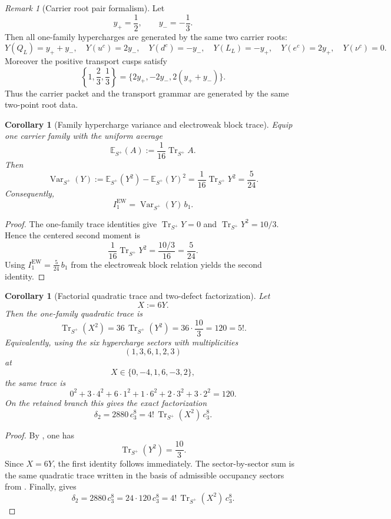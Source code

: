 \documentclass[11pt,a4paper]{article}
\newtheorem{corollary}[theorem]{Corollary}
\theoremstyle{definition}
\theoremstyle{remark}
\newtheorem*{remark}{Remark}
\DeclareMathOperator{\tr}{Tr}
\newcommand{\cthree}{c_3}
\newcommand{\bone}{b_1}
\begin{document}
\begin{remark}[Carrier root pair formalism]
Let
\[
y_+=\frac12,
\qquad
y_-=-\frac13.
\]
Then all one-family hypercharges are generated by the same two carrier roots:
\[
Y(Q_L)=y_++y_-,
\quad
Y(u^c)=2y_-,
\quad
Y(d^c)=-y_-,
\quad
Y(L_L)=-y_+,
\quad
Y(e^c)=2y_+,
\quad
Y(\nu^c)=0.
\]
Moreover the positive transport cusps satisfy
\[
\left\{1,\frac23,\frac13\right\}=\{2y_+,-2y_-,2(y_++y_-)\}.
\]
Thus the carrier packet and the transport grammar are generated by the same two-point root data.
\end{remark}

\begin{corollary}[Family hypercharge variance and electroweak block trace]
Equip one carrier family with the uniform average
\[
\mathbb E_{S^+}(A):=\frac{1}{16}\tr_{S^+}A.
\]
Then
\[
\operatorname{Var}_{S^+}(Y)
:=
\mathbb E_{S^+}(Y^2)-\mathbb E_{S^+}(Y)^2
=
\frac{1}{16}\tr_{S^+}Y^2
=
\frac{5}{24}.
\]
Consequently,
\[
I_1^{\mathrm{EW}}=\operatorname{Var}_{S^+}(Y)\,\bone.
\]
\end{corollary}

\begin{proof}
The one-family trace identities give $\tr_{S^+}Y=0$ and $\tr_{S^+}Y^2=10/3$. Hence the centered second moment is
\[
\frac{1}{16}\tr_{S^+}Y^2=\frac{10/3}{16}=\frac{5}{24}.
\]
Using $I_1^{\mathrm{EW}}=\frac{5}{24}\,\bone$ from the electroweak block relation yields the second identity.
\end{proof}

\begin{corollary}[Factorial quadratic trace and two-defect factorization]
\label{cor:factorial-trace-delta2}
Let
\[
X:=6Y.
\]
Then the one-family quadratic trace is
\[
\tr_{S^+}(X^2)
=
36\,\tr_{S^+}(Y^2)
=
36\cdot\frac{10}{3}
=
120
=
5!.
\]
Equivalently, using the six hypercharge sectors with multiplicities
\[
(1,3,6,1,2,3)
\]
at
\[
X\in\{0,-4,1,6,-3,2\},
\]
the same trace is
\[
0^2+3\cdot 4^2+6\cdot 1^2+1\cdot 6^2+2\cdot 3^2+3\cdot 2^2=120.
\]
On the retained branch this gives the exact factorization
\[
\delta_2
=
2880\,\cthree^8
=
4!\,\tr_{S^+}(X^2)\,\cthree^8.
\]
\end{corollary}

\begin{proof}
By , one has
\[
\tr_{S^+}(Y^2)=\frac{10}{3}.
\]
Since $X=6Y$, the first identity follows immediately. The sector-by-sector sum is the same quadratic trace written in the basis of admissible occupancy sectors from . Finally,  gives
\[
\delta_2=2880\,\cthree^8=24\cdot 120\,\cthree^8
=
4!\,\tr_{S^+}(X^2)\,\cthree^8.
\]
\end{proof}
\end{document}
